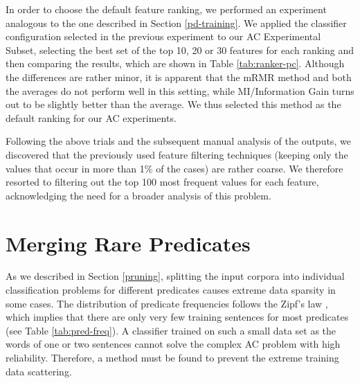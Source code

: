 \documentclass[12pt,notitlepage]{report}
\begin{document}
In order to choose the default feature ranking, we performed an experiment analogous to the one described in Section \ref{pd-training}. We applied the classifier configuration selected in the previous experiment to our AC Experimental Subset, selecting the best set of the top 10, 20 or 30 features for each ranking and then comparing the results, which are shown in Table \ref{tab:ranker-pc}. Although the differences are rather minor, it is apparent that the mRMR method and both the averages do not perform well in this setting, while MI/Information Gain turns out to be slightly better than the average. We thus selected this method as the default ranking for our AC experiments.

Following the above trials and the subsequent manual analysis of the outputs, we discovered that the previously used feature filtering techniques (keeping only the values that occur in more than 1\% of the cases) are rather coarse. We therefore resorted to filtering out the top 100 most frequent values for each feature, acknowledging the need for a broader analysis of this problem.

\section{Merging Rare Predicates}\label{ac-merge}

As we described in Section \ref{pruning}, splitting the input corpora into individual classification problems for different predicates causes extreme data sparsity in some cases. The distribution of predicate frequencies follows the Zipf's law \citep[p. 23ff.]{manning00}, which implies that there are only very few training sentences for most predicates (see Table \ref{tab:pred-freq}). A classifier trained on such a small data set as the words of one or two sentences cannot solve the complex AC problem with high reliability. Therefore, a method must be found to prevent the extreme training data scattering.
\end{document}
